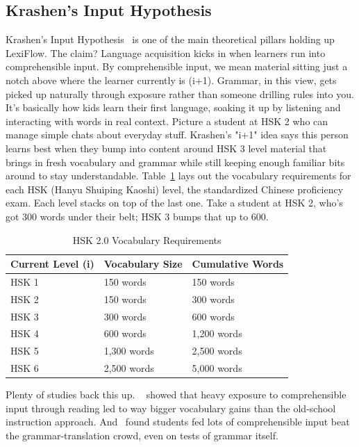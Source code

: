 \subsection{Krashen's Input Hypothesis}Krashen's Input Hypothesis~\citep{krashen1985} is one of the main theoretical pillars holding up LexiFlow. The claim? Language acquisition kicks in when learners run into comprehensible input. By comprehensible input, we mean material sitting just a notch above where the learner currently is (i+1). Grammar, in this view, gets picked up naturally through exposure rather than someone drilling rules into you. It's basically how kids learn their first language, soaking it up by listening and interacting with words in real context. Picture a student at HSK 2 who can manage simple chats about everyday stuff. Krashen's "i+1" idea says this person learns best when they bump into content around HSK 3 level material that brings in fresh vocabulary and grammar while still keeping enough familiar bits around to stay understandable. {Table~{\ref{tab:hsk2}}} lays out the vocabulary requirements for each HSK (Hanyu Shuiping Kaoshi) level, the standardized Chinese proficiency exam. Each level stacks on top of the last one. Take a student at HSK 2, who's got 300 words under their belt; HSK 3 bumps that up to 600. \begin{table}[h]
    \centering
    \caption{HSK 2.0 Vocabulary Requirements \citep{hsk2}}\label{tab:hsk2}
    \begin{tabular}{@{}lll@{}}
        \toprule
        \textbf{Current Level (i)} & \textbf{Vocabulary Size} & \textbf{Cumulative Words} \\
        \midrule
        HSK 1                      & 150 words                & 150 words                 \\
        HSK 2                      & 150 words                & 300 words                 \\
        HSK 3                      & 300 words                & 600 words                 \\
        HSK 4                      & 600 words                & 1,200 words               \\
        HSK 5                      & 1,300 words              & 2,500 words               \\
        HSK 6                      & 2,500 words              & 5,000 words               \\
        \bottomrule
    \end{tabular}
    \smallskip

\end{table} Plenty of studies back this up. ~\citet{RODRIGO2004} showed that heavy exposure to comprehensible input through reading led to way bigger vocabulary gains than the old-school instruction approach. And~\citep{krashen2017} found students fed lots of comprehensible input beat the grammar-translation crowd, even on tests of grammar itself.
